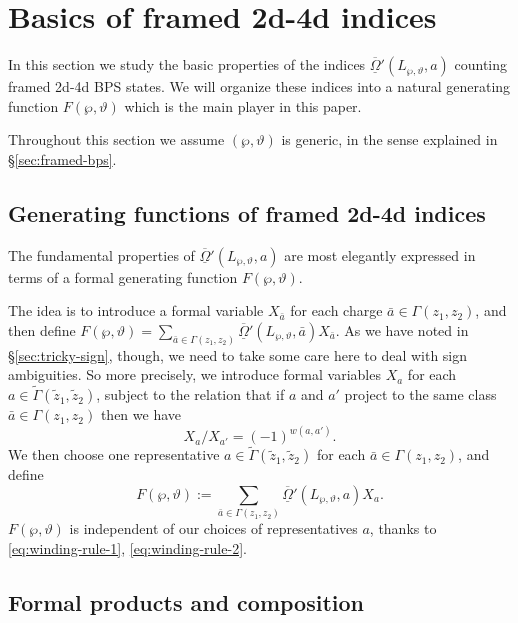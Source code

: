 \documentclass[11pt,a4paper]{article}
\def\tz{{\tilde z}}
\newcommand{\tGamma}{\tilde\Gamma}
\newcommand\fro{{\overline{\underline{\Omega}}}}
\begin{document}
\section{Basics of framed 2d-4d indices} \label{sec:F-basics}

In this section we study the basic properties of the indices
$\fro'(L_{\wp,\vartheta}, a)$ counting framed 2d-4d BPS states.  We will organize
these indices into a natural generating function $F(\wp, \vartheta)$ which is
the main player in this paper.

Throughout this section we assume $(\wp,\vartheta)$ is generic, in the sense explained in
\S\ref{sec:framed-bps}.

\subsection{Generating functions of framed 2d-4d indices} \label{sec:gen-func}

The fundamental properties of $\fro'(L_{\wp,\vartheta}, a)$
are most elegantly expressed in terms of a formal generating function
$F(\wp,\vartheta)$.

The idea is to
introduce a formal variable $X_{\bar a}$ for each charge $\bar a \in \Gamma(z_1, z_2)$,
and then define
$ F(\wp,\vartheta) = \sum_{\bar a \in \Gamma(z_1,z_2)}  \fro'( L_{\wp,\vartheta},\bar a) X_{\bar a}$.
As we have noted in \S\ref{sec:tricky-sign}, though, we need to take some care here to deal with
sign ambiguities.  So more precisely, we introduce formal variables $X_a$ for each $a \in \tGamma(\tz_1, \tz_2)$,
subject to the relation that if $a$ and $a'$ project to the same class $\bar{a} \in \Gamma(z_1,z_2)$
then we have
\begin{equation} \label{eq:winding-rule-2}
 X_a / X_{a'} = (-1)^{w(a,a')}.
\end{equation}
We then choose one representative $a \in \tGamma(\tz_1,\tz_2)$ for each $\bar a \in \Gamma(z_1,z_2)$,
and define
\begin{equation}\label{eq:FLP-gen-prelim}
F(\wp,\vartheta) := \sum_{\bar a \in \Gamma(z_1,z_2)} \fro'( L_{\wp,\vartheta},a) X_{a}.
\end{equation}
$F(\wp,\vartheta)$ is independent of our choices of
representatives $a$, thanks to \eqref{eq:winding-rule-1}, \eqref{eq:winding-rule-2}.


\subsection{Formal products and composition}
\end{document}
